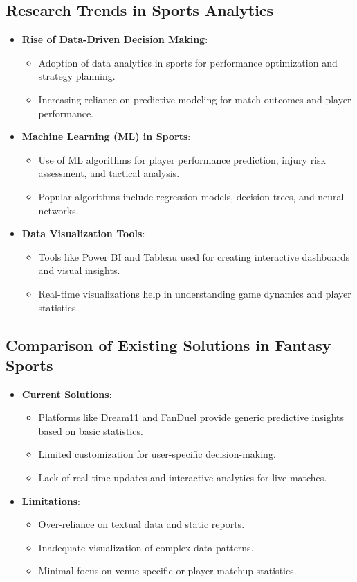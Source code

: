 \subsection{Research Trends in Sports Analytics}
\begin{itemize}
    \item \textbf{Rise of Data-Driven Decision Making}:
    \begin{itemize}
        \item Adoption of data analytics in sports for performance optimization and strategy planning.
        \item Increasing reliance on predictive modeling for match outcomes and player performance.
    \end{itemize}
    \item \textbf{Machine Learning (ML) in Sports}:
    \begin{itemize}
        \item Use of ML algorithms for player performance prediction, injury risk assessment, and tactical analysis.
        \item Popular algorithms include regression models, decision trees, and neural networks.
    \end{itemize}
    \item \textbf{Data Visualization Tools}:
    \begin{itemize}
        \item Tools like Power BI and Tableau used for creating interactive dashboards and visual insights.
        \item Real-time visualizations help in understanding game dynamics and player statistics.
    \end{itemize}
\end{itemize}

\subsection{Comparison of Existing Solutions in Fantasy Sports}
\begin{itemize}
    \item \textbf{Current Solutions}:
    \begin{itemize}
        \item Platforms like Dream11 and FanDuel provide generic predictive insights based on basic statistics.
        \item Limited customization for user-specific decision-making.
        \item Lack of real-time updates and interactive analytics for live matches.
    \end{itemize}
    \item \textbf{Limitations}:
    \begin{itemize}
        \item Over-reliance on textual data and static reports.
        \item Inadequate visualization of complex data patterns.
        \item Minimal focus on venue-specific or player matchup statistics.
    \end{itemize}
\end{itemize}
